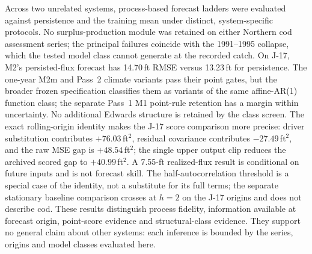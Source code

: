 Across two unrelated systems, process-based forecast ladders were evaluated against persistence and the training mean under distinct, system-specific protocols. No surplus-production module was retained on either Northern cod assessment series; the principal failures coincide with the 1991--1995 collapse, which the tested model class cannot generate at the recorded catch. On J-17, M2's persisted-flux forecast has 14.70\,ft RMSE versus 13.23\,ft for persistence. The one-year M2m and Pass~2 climate variants pass their point gates, but the broader frozen specification classifies them as variants of the same affine-AR(1) function class; the separate Pass~1 M1 point-rule retention has a margin within uncertainty. No additional Edwards structure is retained by the class screen. The exact rolling-origin identity makes the J-17 score comparison more precise: driver substitution contributes $+76.03$\,ft$^2$, residual covariance contributes $-27.49$\,ft$^2$, and the raw MSE gap is $+48.54$\,ft$^2$; the single upper output clip reduces the archived scored gap to $+40.99$\,ft$^2$. A 7.55-ft realized-flux result is conditional on future inputs and is not forecast skill. The half-autocorrelation threshold is a special case of the identity, not a substitute for its full terms; the separate stationary baseline comparison crosses at $h=2$ on the J-17 origins and does not describe cod. These results distinguish process fidelity, information available at forecast origin, point-score evidence and structural-class evidence. They support no general claim about other systems: each inference is bounded by the series, origins and model classes evaluated here.
